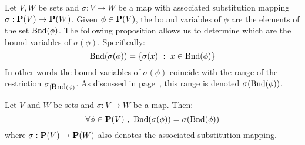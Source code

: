 Let $V,W$ be sets and $\sigma:V\to W$ be a map with associated
substitution mapping $\sigma:\mbox{${\bf P}(V)$}\to{\bf P}(W)$. Given $\phi\in\mbox{${\bf P}(V)$}$,
the bound variables of $\phi$ are the elements of the set
$\mbox{\rm Bnd}(\phi)$. The following proposition allows us to determine
which are the bound variables of $\sigma(\phi)$. Specifically:
    \[
    \bound(\sigma(\phi))=\{\sigma(x)\ :\ x\in\bound(\phi)\}
    \]
In other words the bound variables of $\sigma(\phi)$ coincide with
the range of the restriction $\sigma_{|\mbox{\rm Bnd}(\phi)}$. As discussed
in page~\pageref{logic:lemma:pullback}, this range is denoted
$\sigma(\mbox{\rm Bnd}(\phi))$.
\begin{prop}\label{logic:prop:boundvar:of:substitution}
Let $V$ and $W$ be sets and $\sigma:V\to W$ be a map. Then:
    \[
    \forall\phi\in\pv\ ,\ \bound(\sigma(\phi))=\sigma(\bound(\phi))
    \]
where $\sigma:\mbox{${\bf P}(V)$}\to{\bf P}(W)$ also denotes the associated
substitution mapping.
\end{prop}
